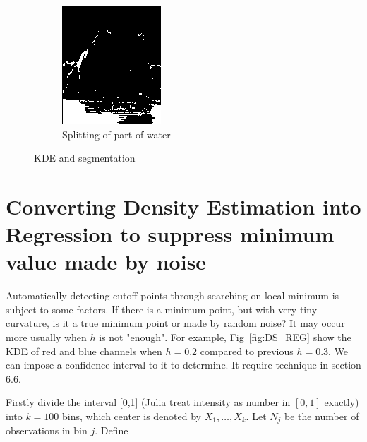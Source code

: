 \documentclass{article}
\begin{document}
\begin{figure}[htb]
\begin{subfigure}[b]{0.24\linewidth}
    \includegraphics[width=\linewidth]{images/toad_split_water.png}
    \caption{Splitting of part of water}
  \end{subfigure}
  \caption{KDE and segmentation}
  \label{fig:splitting}
\end{figure}

\section{Converting Density Estimation into Regression to suppress minimum value made by noise}

Automatically detecting cutoff points through searching on local minimum is subject to some factors. 
If there is a minimum point, but with very tiny curvature, is it a true minimum point or made by random noise? 
It may occur more usually when $h$ is not "enough".
For example, Fig~\ref{fig:DS_REG} show the KDE of red and blue channels when $h=0.2$ compared to previous $h=0.3$.
We can impose a confidence interval to it to determine. 
It require technique in \cite{wasserman2006all} section 6.6.

Firstly divide the interval [0,1] (Julia treat intensity as number in $[0,1]$ exactly) into $k=100$ bins, 
which center is denoted by $X_1,\dots,X_k$. Let $N_j$ be the number of observations in bin $j$. Define
\end{document}
